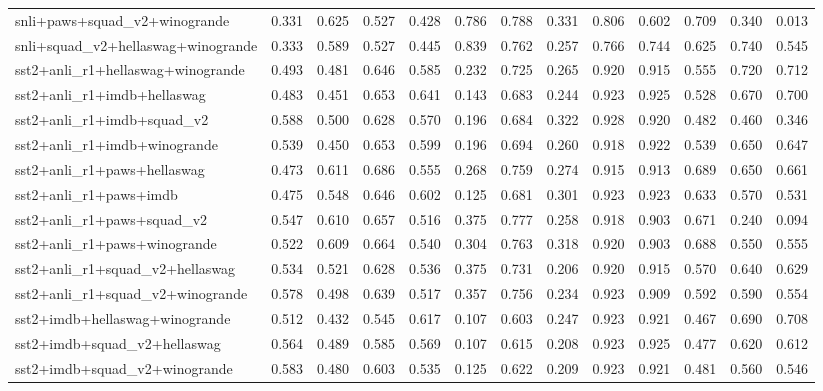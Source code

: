 \begin{table}[t]
\begin{tabular}{lrrrrrrrrrrrr}
    snli+paws+squad\_v2+winogrande & 0.331 & 0.625 & 0.527 & 0.428 & 0.786 & 0.788 & 0.331 & 0.806 & 0.602 & 0.709 & 0.340 & 0.013 \\
    snli+squad\_v2+hellaswag+winogrande & 0.333 & 0.589 & 0.527 & 0.445 & 0.839 & 0.762 & 0.257 & 0.766 & 0.744 & 0.625 & 0.740 & 0.545 \\
    sst2+anli\_r1+hellaswag+winogrande & 0.493 & 0.481 & 0.646 & 0.585 & 0.232 & 0.725 & 0.265 & 0.920 & 0.915 & 0.555 & 0.720 & 0.712 \\
    sst2+anli\_r1+imdb+hellaswag & 0.483 & 0.451 & 0.653 & 0.641 & 0.143 & 0.683 & 0.244 & 0.923 & 0.925 & 0.528 & 0.670 & 0.700 \\
    sst2+anli\_r1+imdb+squad\_v2 & 0.588 & 0.500 & 0.628 & 0.570 & 0.196 & 0.684 & 0.322 & 0.928 & 0.920 & 0.482 & 0.460 & 0.346 \\
    sst2+anli\_r1+imdb+winogrande & 0.539 & 0.450 & 0.653 & 0.599 & 0.196 & 0.694 & 0.260 & 0.918 & 0.922 & 0.539 & 0.650 & 0.647 \\
    sst2+anli\_r1+paws+hellaswag & 0.473 & 0.611 & 0.686 & 0.555 & 0.268 & 0.759 & 0.274 & 0.915 & 0.913 & 0.689 & 0.650 & 0.661 \\
    sst2+anli\_r1+paws+imdb & 0.475 & 0.548 & 0.646 & 0.602 & 0.125 & 0.681 & 0.301 & 0.923 & 0.923 & 0.633 & 0.570 & 0.531 \\
    sst2+anli\_r1+paws+squad\_v2 & 0.547 & 0.610 & 0.657 & 0.516 & 0.375 & 0.777 & 0.258 & 0.918 & 0.903 & 0.671 & 0.240 & 0.094 \\
    sst2+anli\_r1+paws+winogrande & 0.522 & 0.609 & 0.664 & 0.540 & 0.304 & 0.763 & 0.318 & 0.920 & 0.903 & 0.688 & 0.550 & 0.555 \\
    sst2+anli\_r1+squad\_v2+hellaswag & 0.534 & 0.521 & 0.628 & 0.536 & 0.375 & 0.731 & 0.206 & 0.920 & 0.915 & 0.570 & 0.640 & 0.629 \\
    sst2+anli\_r1+squad\_v2+winogrande & 0.578 & 0.498 & 0.639 & 0.517 & 0.357 & 0.756 & 0.234 & 0.923 & 0.909 & 0.592 & 0.590 & 0.554 \\
    sst2+imdb+hellaswag+winogrande & 0.512 & 0.432 & 0.545 & 0.617 & 0.107 & 0.603 & 0.247 & 0.923 & 0.921 & 0.467 & 0.690 & 0.708 \\
    sst2+imdb+squad\_v2+hellaswag & 0.564 & 0.489 & 0.585 & 0.569 & 0.107 & 0.615 & 0.208 & 0.923 & 0.925 & 0.477 & 0.620 & 0.612 \\
    sst2+imdb+squad\_v2+winogrande & 0.583 & 0.480 & 0.603 & 0.535 & 0.125 & 0.622 & 0.209 & 0.923 & 0.921 & 0.481 & 0.560 & 0.546 \\

\end{tabular}
\end{table}
